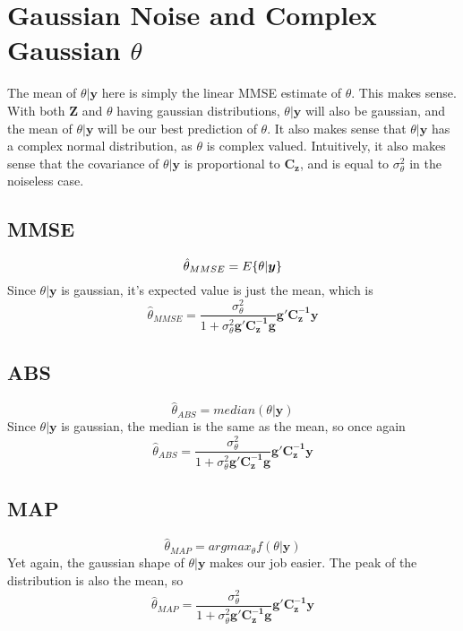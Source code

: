 \documentclass[12pt, letter]{article}
\begin{document}
\section{Gaussian Noise and Complex Gaussian $\theta$}%
\label{sec:gaussian_noise_and_gaussian_theta_}
The mean of $\theta|\bm{y}$ here is simply the linear MMSE estimate of $\theta$. This makes sense. With both $\bm{Z}$ and $\theta$ having gaussian distributions, $\theta|\bm{y}$ will also be gaussian, and the mean of $\theta|\bm{y}$ will be our best prediction of $\theta$. It also makes sense that $\theta|\bm{y}$ has a complex normal distribution, as  $\theta$ is complex valued. Intuitively, it also makes sense that the covariance of $\theta|\bm{y}$ is proportional to $\bm{C_z}$, and is equal to $\sigma_\theta^2$ in the noiseless case.

\subsection{MMSE}
\[
\hat{\theta}_{MMSE} = E\{\theta|\bm{y}\} \\
\] 
Since $\theta|\bm{y}$ is gaussian, it's expected value is just the mean, which is \\
$$\hat{\theta}_{MMSE} = \frac{\sigma_\theta^2}{1+\sigma_\theta^2 \bm{g'C_z^{-1}g}}\bm{g'C_z^{-1}y}$$

\subsection{ABS}
\[
\hat{\theta}_{ABS} = median(\theta|\bm{y})
\] 
Since $\theta|\bm{y}$ is gaussian, the median is the same as the mean, so once again \\
$$\hat{\theta}_{ABS} = \frac{\sigma_\theta^2}{1+\sigma_\theta^2 \bm{g'C_z^{-1}g}}\bm{g'C_z^{-1}y}$$

\subsection{MAP}
\[
\hat{\theta}_{MAP} = argmax_\theta f(\theta|\bm{y})
\] 
Yet again, the gaussian shape of $\theta|\bm{y}$ makes our job easier. The peak of the distribution is also the mean, so \\
$$\hat{\theta}_{MAP} = \frac{\sigma_\theta^2}{1+\sigma_\theta^2 \bm{g'C_z^{-1}g}}\bm{g'C_z^{-1}y}$$
\end{document}
